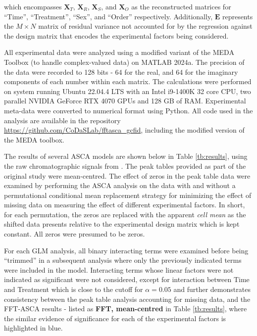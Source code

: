 \documentclass[preprint,12pt]{elsarticle}
\begin{document}
\noindent which encompasses $\mathbf{X}_T$, $\mathbf{X}_R$, $\mathbf{X}_S$, and $\mathbf{X}_O$ as the reconstructed matrices for ``Time'', ``Treatment'', ``Sex'', and ``Order'' respectively. Additionally, $\mathbf{E}$ represents the $M \times N$ matrix of residual variance not accounted for by the regression against the design matrix that encodes the experimental factors being considered. 

All experimental data were analyzed using a modified variant of the MEDA Toolbox \cite{camacho2015multivariate} (to handle complex-valued data) on MATLAB 2024a. The precision of the data were recorded to 128 bits - 64 for the real, and 64 for the imaginary components of each number within each matrix. The calculations were performed on system running Ubuntu 22.04.4 LTS with an Intel i9-1400K 32 core CPU, two parallel NVIDIA GeForce RTX 4070 GPUs and 128 GB of RAM. Experimental meta-data were converted to numerical format using Python. All code used in the analysis are available in the repository \url{https://github.com/CoDaSLab/fftasca_gcfid}, including the modified version of the MEDA toolbox.

The results of several ASCA models are shown below in Table \ref{tb:results}, using the raw chromatographic signals from \cite{lo2023immune}.  The peak tables provided as part of the original study were mean-centred. The effect of zeros in the peak table data were examined by performing the ASCA analysis on the data with and without a permutational conditional mean replacement strategy for minimizing the effect of missing data on measuring the effect of different experimental factors. In short, for each permutation, the zeros are replaced with the apparent \textit{cell mean} as the shifted data presents relative to the experimental design matrix which is kept constant. All zeros were presumed to be zeros.

For each GLM analysis, all binary interacting terms were examined before being ``trimmed'' in a subsequent analysis where only the previously indicated terms were included in the model. Interacting terms whose linear factors were not indicated as significant were not considered, except for interaction between Time and Treatment which is close to the cutoff for $\alpha = 0.05$ and further demonstrates consistency between the peak table analysis accounting for missing data, and the FFT-ASCA results - listed as \textbf{FFT, mean-centred} in Table \ref{tb:results}, where the similar evidence of significance for each of the experimental factors is highlighted in blue. 
\end{document}

